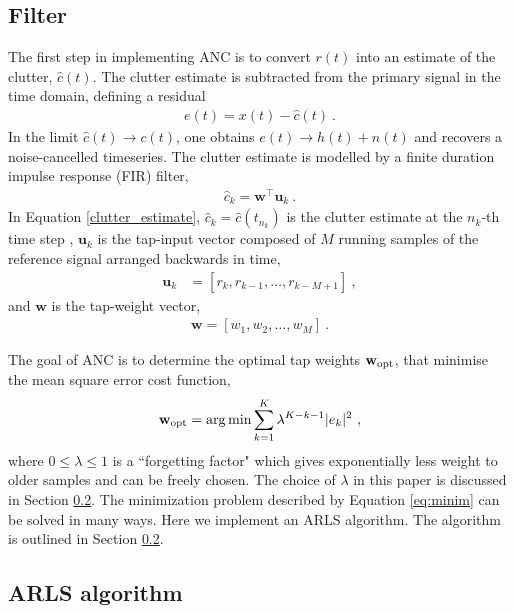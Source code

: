 \documentclass[pra,superscriptaddress,reprint,amsmath,amssymb,nofootinbib]{revtex4-2}
\begin{document}
\subsection{Filter}

The first step in implementing ANC is to convert $r(t)$ into an estimate of the clutter, $\hat{c}(t)$. The clutter estimate is subtracted from the primary signal in the time domain, defining a residual
\begin{eqnarray}
	e(t) = x(t) - \hat{c}(t) \ .\label{eq:error_estimate}
\end{eqnarray}
In the limit $\hat{c}(t) \to c(t)$, one obtains	$e(t) \to h(t) + n(t)$ and recovers a noise-cancelled timeseries. The clutter estimate is modelled by a finite duration impulse response (FIR) filter,
\begin{eqnarray}
	\hat{c}_k = \mathbf{w}^{\intercal}\mathbf{u}_k \ . \label{clutter_estimate}
\end{eqnarray}
In Equation \eqref{clutter_estimate}, ${\hat c}_k = {\hat c}(t_{n_k})$ is the clutter estimate at the $n_k$-th time step , $\mathbf{u}_k$ is the tap-input vector composed of $M$ running samples of the reference signal arranged backwards in time,
 \begin{eqnarray}
 	\mathbf{u}_k &= [r_k, r_{k-1}, \dots, r_{k-M+1}] \ ,
 \end{eqnarray}
and $\mathbf{w}$ is the tap-weight vector,
 \begin{eqnarray}
	\mathbf{w} = [w_1, w_{2}, \dots, w_{M}] \ .
\end{eqnarray}

The goal of ANC is to determine the optimal tap weights $\mathbf{w}_{\rm opt}$, that minimise the mean square error cost function,
\begin{eqnarray}
	\mathbf{w}_{\rm opt} = \arg \min \sum_{k=1}^{K} \lambda^{K-k-1} |e_k|^2 \ , \label{eq:minim}
\end{eqnarray}
where $0 \leq \lambda \leq 1$ is a ``forgetting factor" which gives exponentially less weight to older samples and can be freely chosen. The choice of $\lambda$ in this paper is discussed in Section \ref{sec:ARLS}. The minimization problem described by Equation \eqref{eq:minim} can be solved in many ways. Here we implement an ARLS algorithm. The algorithm is outlined in Section \ref{sec:ARLS}.

\subsection{ARLS algorithm}
\label{sec:ARLS}
\end{document}
